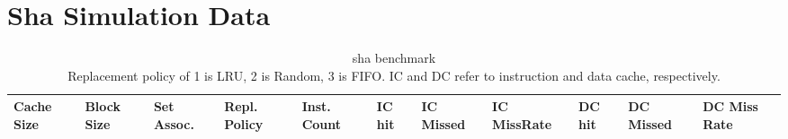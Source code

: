 \documentclass[conference]{IEEEtran}
\begin{document}
\section{Sha Simulation Data}
\vspace{-1cm}
\begin{table}
    \centering
    \caption{sha benchmark \\ Replacement policy of 1 is LRU, 2 is Random, 3 is FIFO. IC and DC refer to instruction and data cache, respectively.}
    \begin{tabular}{|m{.75cm} |m{.75cm} |m{.8cm} | m{.75cm} | l | l | l | l | l | l | l |}
      \hline
      \textbf{Cache Size} & \textbf{ Block Size} & \textbf{Set Assoc.} & \textbf{Repl. Policy} & \textbf{Inst. Count} & \textbf{IC hit} & \textbf{IC Missed} & \textbf{IC MissRate} & \textbf{DC hit} & \textbf{DC Missed} & \textbf{DC Miss Rate} \\ \hline
      

\end{tabular}
\end{table}
\end{document}
